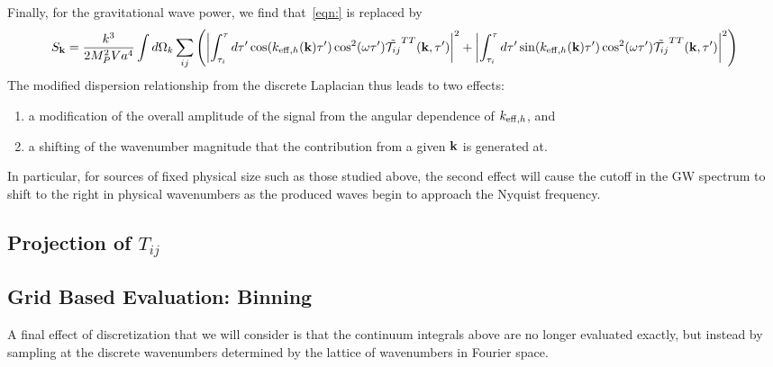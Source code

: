 \documentclass{revtex4}
\begin{document}
Finally, for the gravitational wave power, we find that~\eqref{eqn:} is replaced by
\begin{equation}
  S_{\bf k} = \frac{k^3}{2M_P^2Va^4}\int d\Omega_k\sum_{ij}\left(\left|\int_{\tau_i}^\tau d\tau'\cos(k_{{\rm eff},h}({\bf k})\tau')\cos^2(\omega \tau')\tilde{\mathcal{T}_{ij}}^{TT}({\bf k},\tau')\right|^2 + \left|\int_{\tau_i}^\tau d\tau'\sin(k_{{\rm eff},h}({\bf k})\tau')\cos^2(\omega \tau')\tilde{\mathcal{T}_{ij}}^{TT}({\bf k},\tau')\right|^2 \right)
\end{equation}
The modified dispersion relationship from the discrete Laplacian thus leads to two effects:
\begin{enumerate}
\item a modification of the overall amplitude of the signal from the angular dependence of $k_{{\rm eff},h}$, and
\item a shifting of the wavenumber magnitude that the contribution from a given ${\bf k}$ is generated at.
\end{enumerate}
In particular, for sources of fixed physical size such as those studied above, the second effect will cause the cutoff in the GW spectrum to shift to the right in physical wavenumbers as the produced waves begin to approach the Nyquist frequency.


\subsection{Projection of $T_{ij}$}

\subsection{Grid Based Evaluation: Binning}
A final effect of discretization that we will consider is that the continuum integrals above are no longer evaluated exactly, but instead by sampling at the discrete wavenumbers determined by the lattice of wavenumbers in Fourier space.
\end{document}
